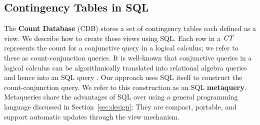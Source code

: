 \documentclass{acm_proc_article-sp}
\newcommand{\ct}{\mathit{ct}}
\begin{document}



 
\subsection{Contingency Tables in SQL} The \textbf{Count Database} (CDB) stores a set of contingency tables each defined as a view. We describe how to create these views using SQL.  
Each row in a $\it{CT}$ represents the count for a conjunctive query in a logical calculus; we refer to these as count-conjunction queries.
It is well-known that conjunctive queries in a logical calculus can be algorithmically translated into relational algebra queries and hence into an SQL query \cite{Ullman1982}. Our approach uses SQL itself to construct the count-conjunction query. We refer to this construction as an SQL \textbf{metaquery}. Metaqueries share the advantages of SQL over using a general programming language discussed in Section~\ref{sec:design}: They are compact, portable, and support automatic updates through the view mechanism.
\end{document}

